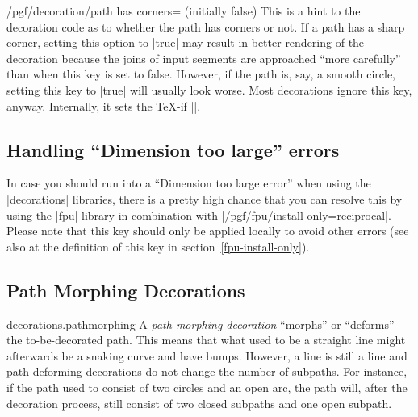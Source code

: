 \begin{key}{/pgf/decoration/path has corners= (initially false)}
    This is a hint to the decoration code as to whether the path has corners or
    not. If a path has a sharp corner, setting this option to |true| may result
    in better rendering of the decoration because the joins of input segments
    are approached ``more carefully'' than when this key is set to false.
    However, if the path is, say, a smooth circle, setting this key to |true|
    will usually look worse. Most decorations ignore this key, anyway.
    Internally, it sets the \TeX-if |\ifpgfdecoratepathhascorners|.
\end{key}


\subsection{Handling ``Dimension too large'' errors}

In case you should run into a ``Dimension too large error'' when using the
|decorations| libraries, there is a pretty high chance that you can resolve
this by using the |fpu| library in combination with
|/pgf/fpu/install only={reciprocal}|. Please note that this key should only be
applied locally to avoid other errors (see also at the definition of this key
in section~\ref{fpu-install-only}).
%
\begin{codeexample}[preamble={\usetikzlibrary{decorations.markings,fpu}}]
\end{codeexample}


\subsection{Path Morphing Decorations}

\begin{pgflibrary}{decorations.pathmorphing}
    A \emph{path morphing decoration} ``morphs'' or ``deforms'' the
    to-be-decorated path. This means that what used to be a straight line might
    afterwards be a snaking curve and have bumps. However, a line is still a
    line and path deforming decorations do not change the number of subpaths.
    For instance, if the path used to consist of two circles and an open arc,
    the path will, after the decoration process, still consist of two closed
    subpaths and one open subpath.
\end{pgflibrary}


